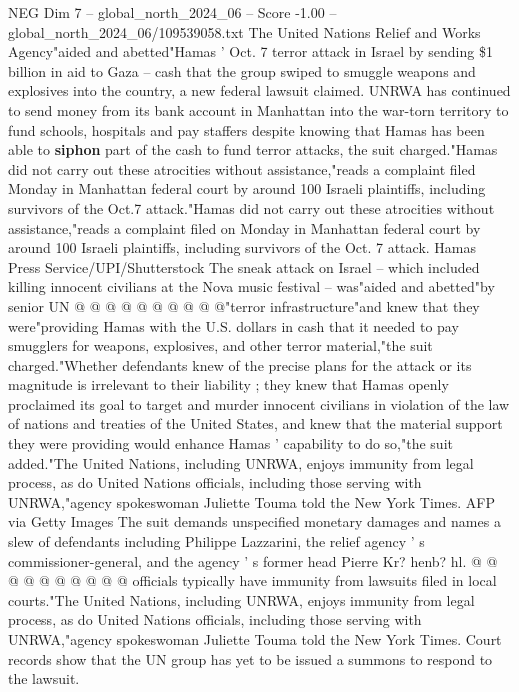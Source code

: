\begin{textsample}{NEG Dim 7 – global\_north\_2024\_06 – Score -1.00 – global\_north\_2024\_06/109539058.txt}  \label{ex:f7_neg_370}
The United Nations Relief and Works Agency"aided and abetted"Hamas ' Oct. 7 terror attack in Israel by sending \$1 billion in aid to Gaza -- cash that the group swiped to smuggle weapons and explosives into the country, a new federal lawsuit claimed.
UNRWA has continued to send money from its bank account in Manhattan into the war-torn territory to fund schools, hospitals and pay staffers despite knowing that Hamas has been able to \textbf{siphon} part of the cash to fund terror attacks, the suit charged."Hamas did not carry out these atrocities without assistance,"reads a complaint filed Monday in Manhattan federal court by around 100 Israeli plaintiffs, including survivors of the Oct.7 attack."Hamas did not carry out these atrocities without assistance,"reads a complaint filed on Monday in Manhattan federal court by around 100 Israeli plaintiffs, including survivors of the Oct. 7 attack.
Hamas Press Service/UPI/Shutterstock The sneak attack on Israel -- which included killing innocent civilians at the Nova music festival -- was"aided and abetted"by senior UN @ @ @ @ @ @ @ @ @ @"terror infrastructure"and knew that they were"providing Hamas with the U.S. dollars in cash that it needed to pay smugglers for weapons, explosives, and other terror material,"the suit charged."Whether defendants knew of the precise plans for the attack or its magnitude is irrelevant to their liability ; they knew that Hamas openly proclaimed its goal to target and murder innocent civilians in violation of the law of nations and treaties of the United States, and knew that the material support they were providing would enhance Hamas ' capability to do so,"the suit added."The United Nations, including UNRWA, enjoys immunity from legal process, as do United Nations officials, including those serving with UNRWA,"agency spokeswoman Juliette Touma told the New York Times.
AFP via Getty Images The suit demands unspecified monetary damages and names a slew of defendants including Philippe Lazzarini, the relief agency ' s commissioner-general, and the agency ' s former head Pierre Kr? henb? hl. @ @ @ @ @ @ @ @ @ @ officials typically have immunity from lawsuits filed in local courts."The United Nations, including UNRWA, enjoys immunity from legal process, as do United Nations officials, including those serving with UNRWA,"agency spokeswoman Juliette Touma told the New York Times.
Court records show that the UN group has yet to be issued a summons to respond to the lawsuit.

\end{textsample}
